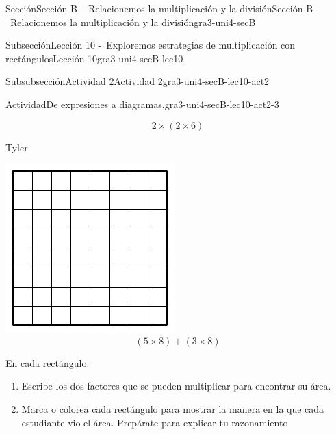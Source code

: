 \documentclass[twoside,10pt,]{article}
\begin{document}
\begin{sectionptx}{Sección}{Sección B -~Relacionemos la multiplicación y la división}{}{Sección B -~Relacionemos la multiplicación y la división}{}{}{gra3-uni4-secB}
\begin{subsectionptx}{Subsección}{Lección 10 -~Exploremos estrategias de multiplicación con rectángulos}{}{Lección 10}{}{}{gra3-uni4-secB-lec10}
\begin{subsubsectionptx}{Subsubsección}{Actividad 2}{}{Actividad 2}{}{}{gra3-uni4-secB-lec10-act2}
\begin{activity}{Actividad}{De expresiones a diagramas.}{gra3-uni4-secB-lec10-act2-3}
\begin{sidebyside}{3}{0.0166666666666667}{0.0166666666666667}{0.0333333333333333}
\begin{sbspanel}{0.3}
%
\begin{equation*}
2 \times (2 \times 6)
\end{equation*}
%
\end{sbspanel}%
\begin{sbspanel}{0.3}%
Tyler%
\par
\includegraphics[width=\linewidth]{external/svg-source/tikz-file-153054.pdf}
%
\begin{equation*}
(5 \times 8) + (3 \times 8)
\end{equation*}
%
\end{sbspanel}%
\end{sidebyside}%
\par
En cada rectángulo:%
%
\begin{enumerate}
\item{}Escribe los dos factores que se pueden multiplicar para encontrar su área.%
\item{}Marca o colorea cada rectángulo para mostrar la manera en la que cada estudiante vio el área. Prepárate para explicar tu razonamiento.%
\end{enumerate}
\end{activity}%
\end{subsubsectionptx}
%
%
\typeout{************************************************}
\typeout{************************************************}

\end{subsectionptx}
\end{sectionptx}
\end{document}
